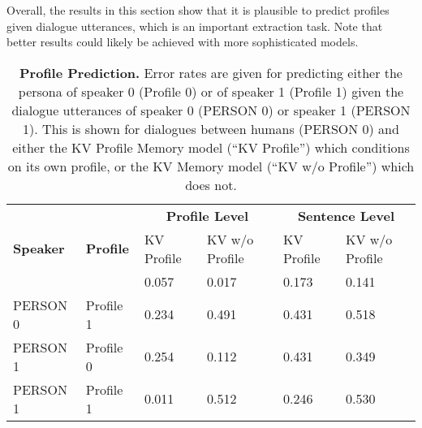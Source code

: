 \documentclass[11pt,a4paper]{article}
\begin{document}
Overall, the results in this section 
show that it is plausible to predict profiles given dialogue utterances, which is
an important extraction task. Note that better results could likely be achieved with more sophisticated models.




\begin{table*}[t]
  \centering
  \begin{tabular}{ll|ll|ll}
  \toprule
  \multirow{3}{*}{\textbf{Speaker}} & 
  \multirow{3}{*}{\textbf{Profile}} & 
   \multicolumn{2}{c}{\textbf{Profile Level}} &   \multicolumn{2}{c}{\textbf{Sentence Level}} \\
&   &  KV Profile & KV w/o Profile    &  KV Profile & KV w/o  Profile \\
  \midrule
PERSON 0 & Profile 0  &  0.057  &  0.017  & 0.173 & 0.141 \\
PERSON 0 & Profile 1  &  0.234  &  0.491 & 0.431 & 0.518 \\
PERSON 1 & Profile 0  &  0.254  &  0.112  & 0.431 & 0.349 \\
PERSON 1 & Profile 1  &  0.011  &  0.512  & 0.246 & 0.530 \\
  \bottomrule
  \end{tabular}
  \caption{{\bf Profile Prediction.}
     \label{tab:task2a}
  Error rates are given for predicting either the persona of speaker 0 (Profile 0) or
of speaker 1 (Profile 1) given the dialogue utterances of speaker 0 (PERSON 0) or speaker
1 (PERSON 1). This is shown for dialogues between humans (PERSON 0) and either the 
KV Profile Memory model (``KV Profile'') which conditions on its own profile, or
the KV Memory model (``KV w/o Profile'') which does not.
  }
\end{table*}
\end{document}
